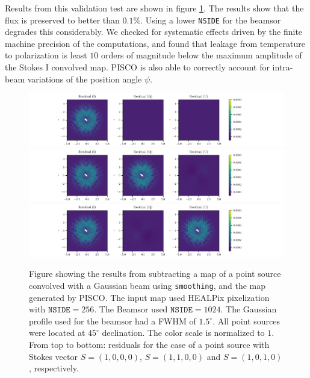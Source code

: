 \documentclass[a4paper,11pt]{article}
\begin{document}
Results from this validation test are shown in figure \ref{fig::stokesqsource256beam1024dec45}. The results show that the flux is preserved to better than $0.1\%$. Using a lower \texttt{NSIDE} for the beamsor degrades this considerably. We checked for systematic effects driven by the finite machine precision of the computations, and found that leakage from temperature to polarization is least $10$ orders of magnitude below the maximum amplitude of the Stokes I convolved map. PISCO is also able to correctly account for intra-beam variations of the position angle $\psi$.

\begin{figure}
	\centering
	\includegraphics[width=1.0\linewidth]{figures/stokes_I_source_256_beam_1024_dec_45.pdf}
	\includegraphics[width=1.0\linewidth]{figures/stokes_Q_source_256_beam_1024_dec_45.pdf}
	\includegraphics[width=1.0\linewidth]{figures/stokes_U_source_256_beam_1024_dec_45.pdf}
	\caption{Figure showing the results from subtracting a map of a point source convolved with a Gaussian beam using \texttt{smoothing}, and the map generated by PISCO. The input map used HEALPix pixelization with $\mathrm{\texttt{NSIDE}} = 256$. The Beamsor used $\mathrm{\texttt{NSIDE}} = 1024$. The Gaussian profile used for the beamsor had a FWHM of $1.5^\circ$. All point sources were located at $45^\circ$ declination. The color scale is normalized to $1$. From top to bottom: residuals for the case of a point source with Stokes vector $S = (1,0,0,0)$, $S=(1,1,0,0)$ and $S=(1,0,1,0)$, respectively.}
	\label{fig::stokesqsource256beam1024dec45}
\end{figure}
\end{document}
